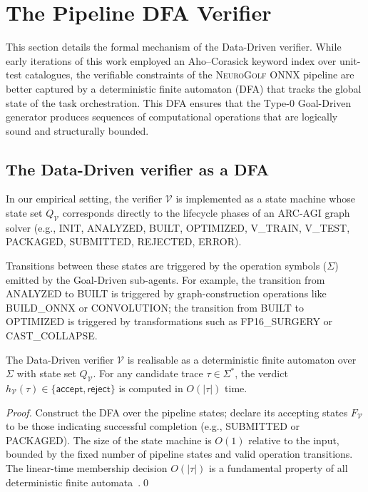\section{The Pipeline DFA Verifier}
\label{sec:indexed}

This section details the formal mechanism of the Data-Driven
verifier. While early iterations of this work employed an
Aho--Corasick keyword index over unit-test catalogues, the
verifiable constraints of the \textsc{NeuroGolf ONNX} pipeline are
better captured by a deterministic finite automaton (DFA) that
tracks the global state of the task orchestration. This DFA ensures
that the Type-0 Goal-Driven generator produces sequences of
computational operations that are logically sound and structurally
bounded.

\subsection{The Data-Driven verifier as a DFA}

In our empirical setting, the verifier $\mathcal{V}$ is implemented
as a state machine whose state set $Q_\mathcal{V}$ corresponds
directly to the lifecycle phases of an ARC-AGI graph solver
(e.g., \textsf{INIT}, \textsf{ANALYZED}, \textsf{BUILT},
\textsf{OPTIMIZED}, \textsf{V\_TRAIN}, \textsf{V\_TEST},
\textsf{PACKAGED}, \textsf{SUBMITTED}, \textsf{REJECTED},
\textsf{ERROR}).

Transitions between these states are triggered by the operation
symbols ($\Sigma$) emitted by the Goal-Driven sub-agents. For
example, the transition from \textsf{ANALYZED} to \textsf{BUILT}
is triggered by graph-construction operations like
\textsf{BUILD\_ONNX} or \textsf{CONVOLUTION}; the transition from
\textsf{BUILT} to \textsf{OPTIMIZED} is triggered by
transformations such as \textsf{FP16\_SURGERY} or
\textsf{CAST\_COLLAPSE}.

\begin{proposition}
\label{prop:verifier-dfa}
The Data-Driven verifier $\mathcal{V}$ is realisable as a
deterministic finite automaton over $\Sigma$ with state set
$Q_\mathcal{V}$.  For any candidate trace
$\tau\in\Sigma^*$, the verdict $h_\mathcal{V}(\tau)\in\{
\mathsf{accept},\mathsf{reject}\}$ is computed in $O(|\tau|)$
time.
\end{proposition}

\begin{proof}
Construct the DFA over the pipeline states; declare its accepting
states $F_\mathcal{V}$ to be those indicating successful completion
(e.g., \textsf{SUBMITTED} or \textsf{PACKAGED}). The size of the
state machine is $O(1)$ relative to the input, bounded by the fixed
number of pipeline states and valid operation transitions. The
linear-time membership decision $O(|\tau|)$ is a fundamental
property of all deterministic finite
automata~\cite{rabin1959finite}.\qed
\end{proof}

